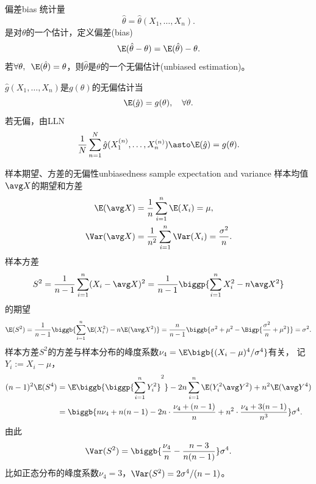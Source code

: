 \begin{definition}{偏差}{bias}
	统计量
	\[
		\hat\theta=\hat\theta(X_1,\ldots,X_n).
	\]
	是对$\theta$的一个估计，定义偏差(bias)%
	\begin{equation}
		\E(\hat\theta-\theta)=\E(\hat\theta)-\theta.
	\end{equation}
	若$\forall\theta,\enspace\E(\hat\theta)=\theta$，则$\hat\theta$是$\theta$的一个无偏估计(unbiased estimation)。
\end{definition}
$\hat g(X_1,\ldots,X_n)$是$g(\theta)$的无偏估计当
\[
	\E(\hat g)=g(\theta),\quad\forall\theta.
\]
若无偏，由LLN
\[
	\frac1{N}\sum_{n=1}^N\hat g(X_1^{(n)},\ldots,X_n^{(n)})\asto\E(\hat g)=g(\theta).
\]
\begin{example}{样本期望、方差的无偏性}{unbiasedness sample expectation and variance}
	样本均值$\avg X$的期望和方差
	\begin{subequations}
		\begin{align}
			\label{eqn:E(avg X)}
			\E(\avg X)&=\frac1n\sum_{i=1}^n\E(X_i)=\mu,\\
			\label{eqn:Var(avg X)}
			\Var(\avg X)&=\frac1{n^2}\sum_{i=1}^n\Var(X_i)=\frac{\sigma^2}n.
		\end{align}
	\end{subequations}
	样本方差
	\[
		S^2=\frac1{n-1}\sum_{i=1}^n(X_i-\avg X)^2=\frac1{n-1}\biggp{\sum_{i=1}^nX_i^2-n\avg X^2}
	\]
	的期望
	\begin{equation}
		\label{eqn:E(S2)}
		\E(S^2)=\frac1{n-1}\biggb{\sum_{i=1}^n\E(X_i^2)-n\E(\avg X^2)}=\frac n{n-1}\biggb{\sigma^2+\mu^2-\Bigp{\frac{\sigma^2}n+\mu^2}}=\sigma^2.
	\end{equation}
	样本方差$S^2$的方差与样本分布的峰度系数$\nu_4=\E\bigb{(X_i-\mu)^4/\sigma^4}$有关，
	记$Y_i:=X_i-\mu$，
	\begin{align*}
		(n-1)^2\E(S^4)&=\E\biggb{\biggp{\sum_{i=1}^nY_i^2}^2}-2n\sum_{i=1}^n\E(Y_i^2\avg Y^2)+n^2\E(\avg Y^4)\\
		&=\biggb{n\nu_4+n(n-1)-2n\cdot\frac{\nu_4+(n-1)}n+n^2\cdot\frac{\nu_4+3(n-1)}{n^3}}\sigma^4.
	\end{align*}
	由此
	\begin{equation}
		\label{eqn:Var(S2)}
		\Var(S^2)=\biggb{\frac{\nu_4}n-\frac{n-3}{n(n-1)}}\sigma^4.
	\end{equation}
	比如正态分布的峰度系数$\nu_4=3$，$\Var(S^2)=2\sigma^4/(n-1)$。
\end{example}
